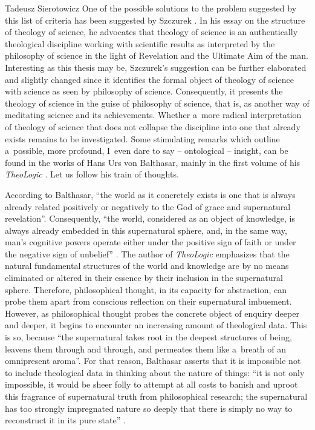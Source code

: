 \begin{artengenv}{Tadeusz Sierotowicz}
One of the possible solutions to the problem suggested by this list of criteria has been suggested by Szczurek 
\parencite*[][pp.133–134]{maczka_teologia_2015-1}. %
 In his essay on the structure of theology of science, he advocates that theology of science is an authentically theological discipline working with scientific results as interpreted by the philosophy of science in the light of Revelation and the Ultimate Aim of the man. Interesting as this thesis may be, Szczurek's suggestion can be further elaborated and slightly changed since it identifies the formal object of theology of science with science as seen by philosophy of science. Consequently, it presents the theology of science in the guise of philosophy of science, that is, as another way of meditating science and its achievements. Whether a~more radical interpretation of theology of science that does not collapse the discipline into one that already exists remains to be investigated. Some stimulating remarks which outline a~possible, more profound, I~even dare to say -- ontological -- insight, can be found in the works of Hans Urs von Balthasar, mainly in the first volume of his \textit{TheoLogic} 
\parencite[][]{balthasar_theo-logic_2000}. %
 Let us follow his train of thoughts.



According to Balthasar, ``the world as it concretely exists is one that is always already related positively or negatively to the God of grace and supernatural revelation''. Consequently, ``the world, considered as an object of knowledge, is always already embedded in this supernatural sphere, and, in the same way, man's cognitive powers operate either under the positive sign of faith or under the negative sign of unbelief'' 
\parencite[][p.11]{balthasar_theo-logic_2000}. %
 The author of \textit{TheoLogic} emphasizes that the natural fundamental structures of the world and knowledge are by no means eliminated or altered in their essence by their inclusion in the supernatural sphere. Therefore, philosophical thought, in its capacity for abstraction, can probe them apart from conscious reflection on their supernatural imbuement. However, as philosophical thought probes the concrete object of enquiry deeper and deeper, it begins to encounter an increasing amount of theological data. This is so, because ``the supernatural takes root in the deepest structures of being, leavens them through and through, and permeates them like a~breath of an omnipresent aroma''. For that reason, Balthasar asserts that it is impossible not to include theological data in thinking about the nature of things: ``it is not only impossible, it would be sheer folly to attempt at all costs to banish and uproot this fragrance of supernatural truth from philosophical research; the supernatural has too strongly impregnated nature so deeply that there is simply no way to reconstruct it in its pure state'' 
\parencite[][p.12]{balthasar_theo-logic_2000}.%





\end{artengenv}
